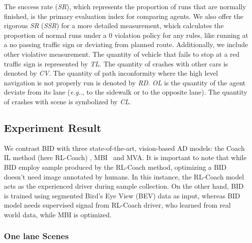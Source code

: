 \documentclass[preprint,12pt]{elsarticle}
\makeatletter
\DeclareRobustCommand\onedot{\futurelet\@let@token\@onedot}
\def\@onedot{\ifx\@let@token.\else.\null\fi\xspace}
\def\eg{\emph{e.g}\onedot} \def\Eg{\emph{E.g}\onedot}
\makeatother
\begin{document}
The success rate (\emph{SR}), which represents the proportion of runs that are normally finished, is the primary evaluation index for comparing agents.
We also offer the rigorous \emph{SR} (\emph{SSR}) for a more detailed measurement, which calculates the proportion of normal runs under a 0 violation policy for any rules, like running at a no passing traffic sign or deviating from planned route.
Additionally, we include other violative measurement.
The quantity of vehicle that fails to stop at a red traffic sign is represented by \emph{TL}.
The quantity of crashes with other cars is denoted by \emph{CV}.
The quantity of path inconformity where the high level navigation is not properly run is denoted by \emph{RD}.
\emph{OL} is the quantity of the agent deviate from its lane ({\eg}, to the sidewalk or to the opposite lane).
The quantity of crashes with scene is symbolized by \emph{CL}.




\subsection{Experiment Result}
\label{sec:Results}
\hspace{1pc}We contrast BID with three state-of-the-art, vision-based AD models: the Coach IL method (here RL-Coach) \cite{Zhang:2021}, MBI~\cite{Hu:2022} and MVA\cite{xiao2023scaling}. 
It is important to note that while BID employ sample produced by the RL-Coach method, optimizing a BID doesn't need image annotated by humans. 
In this instance, the RL-Coach model acts as the experienced driver during sample collection.
On the other hand, BID is trained using segmented Bird's Eye View (BEV) data as input, whereas BID model needs supervised signal from RL-Coach driver, who learned from real world data, while MBI is optimized.


\subsubsection{One lane Scenes} \label{sec:small_town_results}
\end{document}

